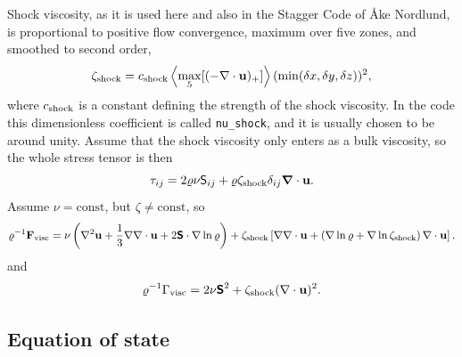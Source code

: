 \documentclass[\mydriver,12pt,twoside,notitlepage,a4paper]{article}
\newcommand{\code}[1]{\texttt{#1}}
\newcommand{\grad}    {\nabla}
\newcommand{\Div}     {\nabla\cdot}
\newcommand{\Laplace} {\nabla^2}
\newcommand{\vekt}[1] {\mathbf{#1}}
\newcommand{\uv}            {\vekt{u}}
\newcommand{\Strain}        {\boldsymbol{\mathsf{S}}}
\newcommand{\nab}{\mbox{\boldmath $\nabla$} {}}
\begin{document}
Shock viscosity, as it is used here and also in the Stagger Code of {\AA}ke Nordlund,
is proportional to positive flow convergence, maximum over
five zones, and smoothed to second order,
\begin{equation}
\zeta_{\rm shock}=c_{\rm shock}\left<\max_5[(-\Div\uv)_+]\right>(\min(\delta x,\delta y,\delta z))^2,
\end{equation}
where $c_{\rm shock}$ is a constant defining the strength of the shock viscosity.
In the code this dimensionless coefficient is called \code{nu_shock}, and it
is usually chosen to be around unity.
Assume that the shock viscosity only enters as a bulk viscosity,
so the whole stress tensor is then
\begin{equation}
\vekt{\tau}_{ij}=2\varrho\nu{\sf S}_{ij}+\varrho\zeta_{\rm shock}\delta_{ij}\nab\cdot\uv.
\end{equation}
Assume $\nu=\mbox{const}$, but $\zeta\neq\mbox{const}$, so
\begin{equation}
\varrho^{-1}\vekt{F}_{\rm visc}=
\nu\left(\Laplace\uv+\frac{1}{3}\grad\Div\uv+2\Strain\cdot\grad\ln\varrho\right)
+\zeta_{\rm shock}\left[\grad\Div\uv+\left(\grad\ln\varrho+\grad\ln\zeta_{\rm shock}\right)\Div\uv\right].
\end{equation}
and
\begin{equation}
\varrho^{-1}\Gamma_{\rm visc}=2\nu\Strain^2+\zeta_{\rm shock}(\Div\uv)^2.
\end{equation}


\subsection{Equation of state}
\label{S-eos}
\end{document}
